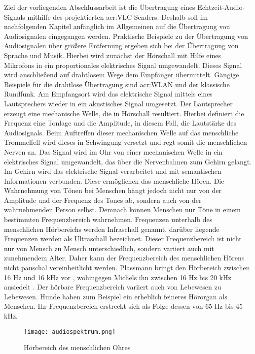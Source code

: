 Ziel der vorliegenden Abschlussarbeit ist die Übertragung eines Echtzeit-Audio-Signals mithilfe des projektierten \gls{acr:VLC}-Senders. Deshalb soll im nachfolgenden Kapitel anfänglich im Allgemeinen auf die Übertragung von Audiosignalen eingegangen werden. Praktische Beispiele zu der Übertragung von Audiosignalen über größere Entfernung ergeben sich bei der Übertragung von Sprache und Musik. Hierbei wird zunächst der Hörschall mit Hilfe eines Mikrofons in ein proportionales elektrisches Signal umgewandelt. Dieses Signal wird anschließend auf drahtlosem  Wege dem Empfänger übermittelt. Gängige Beispiele für die drahtlose Übertragung sind \gls{acr:WLAN} und der klassische Rundfunk. Am Empfangsort wird das elektrische Signal mittels eines Lautsprechers wieder in ein akustisches Signal umgesetzt.\cite{plassmannHandbuchElektrotechnik2016} Der Lautsprecher erzeugt eine mechanische Welle, die in Hörschall resultiert. Hierbei definiert die Frequenz eine Tonlage und die Amplitude, in diesem Fall, die Lautstärke des Audiosignals. Beim Auftreffen dieser mechanischen Welle auf das menschliche Trommelfell wird dieses in Schwingung versetzt und regt somit die menschlichen Nerven an. Das Signal wird im Ohr von einer mechanischen Welle in ein elektrisches Signal umgewandelt, das über die Nervenbahnen zum Gehirn gelangt. Im Gehirn wird das elektrische Signal verarbeitet und mit semantischen Informationen verbunden. Diese ermöglichen das menschliche Hören.\cite{stotzaudio} Die Wahrnehmung von Tönen bei Menschen hängt jedoch nicht nur von der Amplitude und der Frequenz des Tones ab, sondern auch von der wahrnehmenden Person selbst. Demnach können Menschen nur Töne in einem bestimmten Frequenzbereich wahrnehmen. Frequenzen unterhalb des menschlichen Hörbereichs werden Infraschall genannt, darüber liegende Frequenzen werden als Ultraschall bezeichnet. Dieser Frequenzbereich ist nicht nur von Mensch zu Mensch unterschiedlich, sondern variiert auch mit zunehmendem Alter. Daher kann der Frequenzbereich des menschlichen Hörens nicht pauschal vereinheitlicht werden. Plassmann bringt den Hörbereich zwischen 16 Hz und 16 kHz vor \cite{plassmannHandbuchElektrotechnik2016}, wohingegen Michels ihn zwischen 16 Hz bis 20 kHz ansiedelt \cite{michelsSonographieOrganUnd2012}. Der hörbare Frequenzbereich variiert auch von Lebewesen zu Lebewesen. Hunde haben zum Beispiel ein erheblich feineres Hörorgan als Menschen. Ihr Frequenzbereich erstreckt sich als Folge dessen von 65 Hz bis 45 kHz.\cite{michelsSonographieOrganUnd2012}

\begin{figure}[H]
	\centering
	\texttt{[image: audiospektrum.png]}
	\caption[Hörbereich des menschlichen Ohres]{Hörbereich des menschlichen Ohres} \cite{michelsSonographieOrganUnd2012}
	\label{fig:audiospektrum}
\end{figure}

